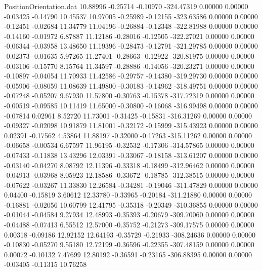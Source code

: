 \begin{filecontents}{PositionOrientation.dat}
  10.88996   -0.25714   -0.10970  -324.47319    0.00000    0.00000   -0.03425   -0.14790   10.45537
  10.97005   -0.25989   -0.12155  -323.63586    0.00000    0.00000   -0.12451   -0.02684   11.34779
  11.04196   -0.26884   -0.12348  -322.81988    0.00000    0.00000   -0.14160   -0.01972    6.87887
  11.12186   -0.28016   -0.12505  -322.27021    0.00000    0.00000   -0.06344   -0.03958   13.48650
  11.19396   -0.28473   -0.12791  -321.29785    0.00000    0.00000   -0.02373   -0.01635    5.97265
  11.27401   -0.28663   -0.12922  -320.81975    0.00000    0.00000   -0.03106   -0.15770    8.15764
  11.34597   -0.28886   -0.14056  -320.23271    0.00000    0.00000   -0.10897   -0.04054   11.70933
  11.42586   -0.29757   -0.14380  -319.29730    0.00000    0.00000   -0.05906   -0.08059   11.08639
  11.49800   -0.30183   -0.14962  -318.49751    0.00000    0.00000   -0.07248   -0.05207    9.67930
  11.57800   -0.30763   -0.15378  -317.72319    0.00000    0.00000   -0.00519   -0.09585   10.11419
  11.65000   -0.30800   -0.16068  -316.99498    0.00000    0.00000   -0.07814    0.02961    8.52720
  11.73001   -0.31425   -0.15831  -316.31269    0.00000    0.00000   -0.09327   -0.02098   10.91879
  11.81001   -0.32172   -0.15999  -315.43923    0.00000    0.00000    0.02391   -0.17562    4.53864
  11.88197   -0.32000   -0.17263  -315.11262    0.00000    0.00000   -0.06658   -0.00534    6.67597
  11.96195   -0.32532   -0.17306  -314.57865    0.00000    0.00000   -0.07433   -0.11838   13.43296
  12.03391   -0.33067   -0.18158  -313.61207    0.00000    0.00000   -0.03140   -0.04270    8.08792
  12.11396   -0.33318   -0.18499  -312.96462    0.00000    0.00000   -0.04913   -0.03968    8.05923
  12.18586   -0.33672   -0.18785  -312.38515    0.00000    0.00000   -0.07622   -0.03267   11.33830
  12.26584   -0.34281   -0.19046  -311.47829    0.00000    0.00000    0.04400   -0.15819    3.60612
  12.33780   -0.33965   -0.20184  -311.21880    0.00000    0.00000   -0.16881   -0.02056   10.60799
  12.41795   -0.35318   -0.20349  -310.36855    0.00000    0.00000   -0.01044   -0.04584    9.27934
  12.48993   -0.35393   -0.20679  -309.70060    0.00000    0.00000   -0.04488   -0.07413    6.55512
  12.57000   -0.35752   -0.21273  -309.17575    0.00000    0.00000    0.00318   -0.09186   12.92152
  12.64193   -0.35729   -0.21933  -308.24636    0.00000    0.00000   -0.10830   -0.05270    9.55180
  12.72199   -0.36596   -0.22355  -307.48159    0.00000    0.00000    0.00072   -0.10132    7.47699
  12.80192   -0.36591   -0.23165  -306.88395    0.00000    0.00000   -0.03405   -0.11315   10.76258

\end{filecontents}
